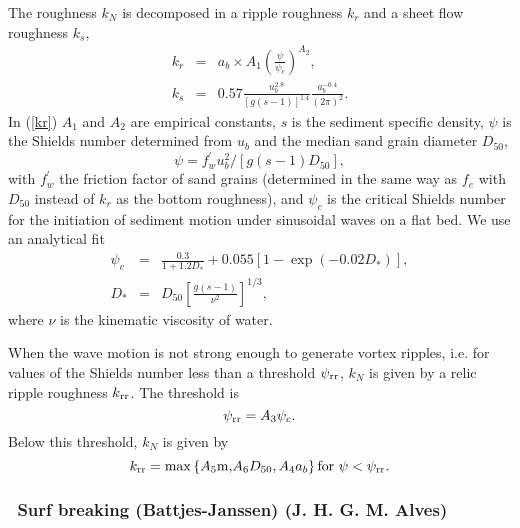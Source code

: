 The roughness $k_{N}$ is decomposed in a ripple roughness $k_{r}$ and a sheet flow roughness $k_{s}$,
\begin{eqnarray}
k_{r} &=&a_{b}\times A_{1}\left( \frac{\psi }{\psi _{c}}\right) ^{A_{2}}, \label{eq:SHOWEX_kr}\\
k_{s} &=&0.57\frac{u_{b}^{2.8}}{\left[ g\left( s-1\right) \right] ^{1.4}}%
\frac{a_{b}^{-0.4}}{\left( 2\pi \right) ^{2}}.
\end{eqnarray}
In (\ref{kr}) $A_1$ and $A_2$ are empirical constants,
$s$ is the sediment specific density, $\psi$ is the Shields number determined from
$u_b$ and the median sand grain diameter $D_{50}$,
\begin{equation}
\psi =f_{w}^{\prime }u_{b}^{2}/\left[g\left( s-1\right) D_{50}\right],
\end{equation}
with $f_{w}^{\prime }$ the friction factor of sand grains (determined in the same way as
$f_e$ with $D_{50}$ instead of $k_r$ as the bottom roughness),
and $\psi _{c}$ is the
critical Shields number for the initiation of
sediment motion under sinusoidal waves on a flat bed.
We use an analytical fit \citep{bk:Soul97} 
\begin{eqnarray}
\psi _{c} &=&\frac{0.3}{1+1.2D_{*}}+0.055\left[ 1-\exp \left(
-0.02D_{*}\right) \right]\label{Soulsby_psic} , \\
D_{*} &=&D_{50}\left[ \frac{g\left( s-1\right) }{\nu ^{2}}\right] ^{1/3},
\end{eqnarray}
where $\nu $ is the kinematic viscosity of water. 

When the wave motion is not strong enough to generate vortex ripples, i.e.
for values of the Shields number less than a threshold $\psi _{{\rm rr}}$,
$k_{N}$ is given by a relic ripple roughness $k_{{\rm rr}}$. The threshold is
\begin{equation}
\psi _{{\rm rr}}=A_{3}\psi _{c}.
\end{equation}
Below this threshold, $k_{N}$ is given by 
\begin{equation}
k_{{\rm rr}}=\max \left\{ A_5 {\rm m,} A_6 D_{50}, A_{4}a_{b}\right\}
{\rm for\ }\psi <\psi _{{\rm rr}}.\label{eq:SHOWEX_krr}
\end{equation}





\vsssub
\subsubsection{~Surf breaking (Battjes-Janssen) \hfill {\rm (J. H. G. M. Alves)}} \label{sec:BJ}
\vsssub

